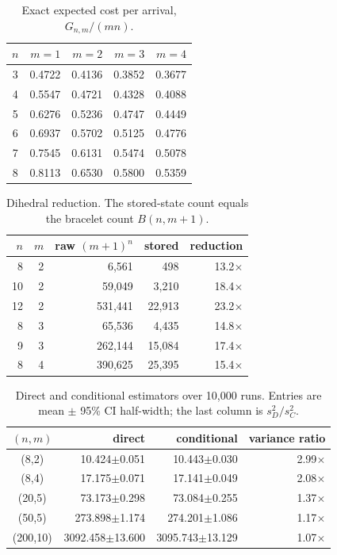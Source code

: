 \begin{table}[t]
\centering
\caption{Exact expected cost per arrival, $G_{n,m}/(mn)$.}
\label{tab:costs}
\setlength{\tabcolsep}{5pt}
\begin{tabular}{c@{\quad}rrrr}
\toprule
$n$ & $m=1$ & $m=2$ & $m=3$ & $m=4$ \\
\midrule
3 & 0.4722 & 0.4136 & 0.3852 & 0.3677 \\
4 & 0.5547 & 0.4721 & 0.4328 & 0.4088 \\
5 & 0.6276 & 0.5236 & 0.4747 & 0.4449 \\
6 & 0.6937 & 0.5702 & 0.5125 & 0.4776 \\
7 & 0.7545 & 0.6131 & 0.5474 & 0.5078 \\
8 & 0.8113 & 0.6530 & 0.5800 & 0.5359 \\
\bottomrule
\end{tabular}
\end{table}

\begin{table}[t]
\centering
\caption{Dihedral reduction. The stored-state count equals the bracelet count $B(n,m+1)$.}
\label{tab:states}
\setlength{\tabcolsep}{4.5pt}
\begin{tabular}{rrrrr}
\toprule
$n$ & $m$ & raw $(m+1)^n$ & stored & reduction \\
\midrule
8 & 2 & 6,561 & 498 & 13.2$\times$ \\
10 & 2 & 59,049 & 3,210 & 18.4$\times$ \\
12 & 2 & 531,441 & 22,913 & 23.2$\times$ \\
8 & 3 & 65,536 & 4,435 & 14.8$\times$ \\
9 & 3 & 262,144 & 15,084 & 17.4$\times$ \\
8 & 4 & 390,625 & 25,395 & 15.4$\times$ \\
\bottomrule
\end{tabular}
\end{table}

\begin{table}[t]
\centering
\caption{Direct and conditional estimators over 10,000 runs. Entries are mean $\pm$ 95\% CI half-width; the last column is $s_D^2/s_C^2$.}
\label{tab:simulation}
\setlength{\tabcolsep}{4pt}
\begin{tabular}{crrr}
\toprule
$(n,m)$ & direct & conditional & variance ratio \\
\midrule
(8,2) & 10.424$\pm$0.051 & 10.443$\pm$0.030 & 2.99$\times$ \\
(8,4) & 17.175$\pm$0.071 & 17.141$\pm$0.049 & 2.08$\times$ \\
(20,5) & 73.173$\pm$0.298 & 73.084$\pm$0.255 & 1.37$\times$ \\
(50,5) & 273.898$\pm$1.174 & 274.201$\pm$1.086 & 1.17$\times$ \\
(200,10) & 3092.458$\pm$13.600 & 3095.743$\pm$13.129 & 1.07$\times$ \\
\bottomrule
\end{tabular}
\end{table}
